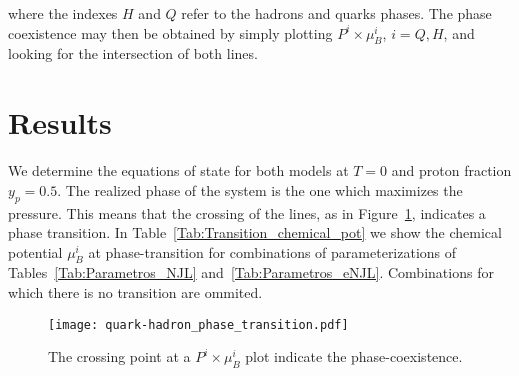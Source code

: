 \documentclass{ws-ijmpcs}
\begin{document}
\noindent{}where the indexes $H$ and $Q$ refer to the hadrons and quarks phases. The phase coexistence may then be obtained by simply plotting $P^i \times \mu_B^i$, $i = Q, H$, and looking for the intersection of both lines.

\section{Results}

We determine the equations of state for both models at $T = 0$ and proton fraction $y_p = 0.5$. The realized phase of the system is the one which maximizes the pressure. This means that the crossing of the lines, as in Figure~\ref{Fig:Pressure_func_chemical_pot}, indicates a phase transition.
%
In Table~\ref{Tab:Transition_chemical_pot} we show the chemical potential $\mu_B^i$ at phase-transition for combinations of parameterizations of Tables~\ref{Tab:Parametros_NJL} and~\ref{Tab:Parametros_eNJL}. Combinations for which there is no transition are ommited.

\begin{figure}
\centering
\caption{The crossing point at a $P^i \times \mu_B^i$ plot indicate the phase-coexistence.\label{Fig:Pressure_func_chemical_pot}}
\texttt{[image: quark-hadron\_phase\_transition.pdf]}
\end{figure}
\end{document}
